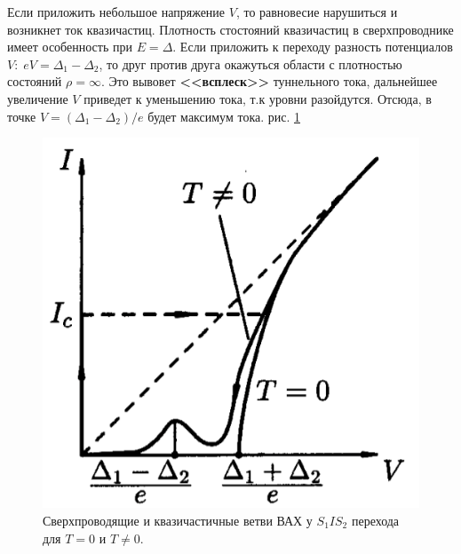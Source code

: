 \documentclass[a4paper]{article}
\begin{document}
Если приложить небольшое напряжение $V$, то равновесие нарушиться и возникнет ток квазичастиц. Плотность стостояний квазичастиц в сверхпроводнике имеет особенность при $E = \Delta$. Если приложить к переходу разность потенциалов $V: \; eV = \Delta_1 - \Delta_2$, 
то друг против друга окажуться области с плотностью состояний $\rho = \infty$. Это вывовет \textbf{<<всплеск>>} туннельного тока, дальнейшее увеличение $V$ приведет к уменьшению тока, т.к уровни разойдутся. Отсюда, в точке $V = (\Delta_1 - \Delta_2)/e$ будет максимум тока. рис. \ref{p3}

\begin{figure}[H]
    \begin{center}
        \includegraphics[scale = 0.5]{p3.png}
        \caption{Сверхпроводящие и квазичастичные ветви ВАХ у $S_1IS_2$ перехода для $T=0$ и $T \neq 0$.}
        \label{p3}
    \end{center}
\end{figure}
\end{document}
